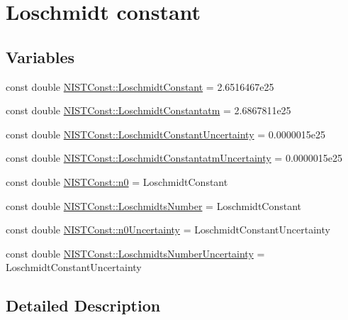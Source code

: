 \hypertarget{group___n_i_s_t_const-_loschmidt_constant}{}\section{Loschmidt constant}
\label{group___n_i_s_t_const-_loschmidt_constant}
\subsection*{Variables}
\begin{DoxyCompactItemize}
\item 
const double \hyperlink{group___n_i_s_t_const-_loschmidt_constant_gab4ddc03e855109d251efa0ae9e8fb80d}{N\+I\+S\+T\+Const\+::\+Loschmidt\+Constant} = 2.\+6516467e25
\item 
const double \hyperlink{group___n_i_s_t_const-_loschmidt_constant_ga1442f26c5c9f899f74ef7b546a41c461}{N\+I\+S\+T\+Const\+::\+Loschmidt\+Constantatm} = 2.\+6867811e25
\item 
const double \hyperlink{group___n_i_s_t_const-_loschmidt_constant_gae1bf8845a08d0554f1045083a143c30a}{N\+I\+S\+T\+Const\+::\+Loschmidt\+Constant\+Uncertainty} = 0.\+0000015e25
\item 
const double \hyperlink{group___n_i_s_t_const-_loschmidt_constant_gaed8885c8d2d27d9d8b88c271e0022228}{N\+I\+S\+T\+Const\+::\+Loschmidt\+Constantatm\+Uncertainty} = 0.\+0000015e25
\item 
const double \hyperlink{group___n_i_s_t_const-_loschmidt_constant_ga95b0a12ed1a4d5aa9f05a08927be123c}{N\+I\+S\+T\+Const\+::n0} = Loschmidt\+Constant
\item 
const double \hyperlink{group___n_i_s_t_const-_loschmidt_constant_gaf6143a6202718104ded1b92da2a0217f}{N\+I\+S\+T\+Const\+::\+Loschmidts\+Number} = Loschmidt\+Constant
\item 
const double \hyperlink{group___n_i_s_t_const-_loschmidt_constant_gab05aaddbc9cb5a104a42cc83ab752d78}{N\+I\+S\+T\+Const\+::n0\+Uncertainty} = Loschmidt\+Constant\+Uncertainty
\item 
const double \hyperlink{group___n_i_s_t_const-_loschmidt_constant_gab851db21b311f09798d0df42d2e25f3f}{N\+I\+S\+T\+Const\+::\+Loschmidts\+Number\+Uncertainty} = Loschmidt\+Constant\+Uncertainty
\end{DoxyCompactItemize}


\subsection{Detailed Description}



